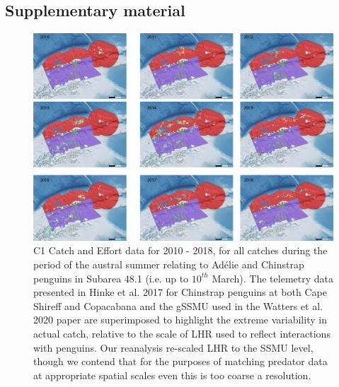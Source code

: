 \documentclass[]{elsarticle} %
\newcommand{\blandscape}{\begin{landscape}}
\newcommand{\elandscape}{\end{landscape}}
\newcommand{\beginsupplement}{\setcounter{table}{0}  \renewcommand{\thetable}{S\arabic{table}}     \setcounter{figure}{0} \renewcommand{\thefigure}{S\arabic{figure}}}
\begin{document}
\newpage
\blandscape
\beginsupplement

\hypertarget{supplementary-material}{%
\section{Supplementary material}\label{supplementary-material}}

\begin{figure}
\includegraphics[width=0.8\linewidth]{./Watters EMM figures/summer catch/Year by year catch} \caption{C1 Catch and Effort data for 2010 - 2018, for all catches during the period of the austral summer relating to Adélie and Chinstrap penguins in Subarea 48.1 (i.e. up to $10^{th}$ March).  The telemetry data presented in Hinke et al. 2017 for Chinstrap penguins at both Cape Shireff and Copacabana and the gSSMU used in the Watters et al. 2020 paper are superimposed to highlight the extreme variability in actual catch, relative to the scale of LHR used to reflect interactions with penguins.  Our reanalysis re-scaled LHR to the SSMU level, though we contend that for the purposes of matching predator data at appropriate spatial scales even this is too coarse a resolution.}\label{fig:Supplementary Figure 1}
\end{figure}
\elandscape
\newpage
\scriptsize
\end{document}

